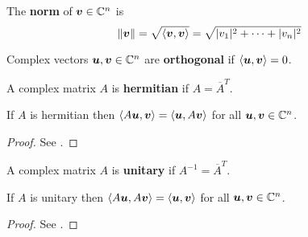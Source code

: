 \begin{definition}
The {\bf norm} \cite[p.463]{KN} of $\boldsymbol{v} \in \mathbb{C}^n$ is
$$
\| \boldsymbol{v} \| = \sqrt{ \langle \boldsymbol{v} , \boldsymbol{v} \rangle } = \sqrt{ |v_1|^2 + \cdots + |v_n|^2 }
$$
\end{definition}

\begin{definition}
Complex vectors $\boldsymbol{u} , \boldsymbol{v} \in \mathbb{C}^n$ are {\bf orthogonal} \cite[p.466]{KN} if $ \langle \boldsymbol{u} , \boldsymbol{v} \rangle = 0$.
\end{definition}

\begin{definition}
A complex matrix $A$ is {\bf hermitian} \cite[p.464]{KN} if $A = \overline{A}^T$.
\end{definition}

\begin{proposition}
If $A$ is hermitian then $\langle A \boldsymbol{u} , \boldsymbol{v} \rangle = \langle \boldsymbol{u} , A \boldsymbol{v} \rangle$ for all $\boldsymbol{u} , \boldsymbol{v} \in \mathbb{C}^n$.

\begin{proof}
See \cite[p.464]{KN}.
\end{proof}
\end{proposition}

\begin{definition}
A complex matrix $A$ is {\bf unitary} \cite[p.466]{KN} if $A^{-1} = \overline{A}^T$.
\end{definition}

\begin{proposition}
If $A$ is unitary then $\langle A \boldsymbol{u} , A \boldsymbol{v} \rangle = \langle \boldsymbol{u} , \boldsymbol{v} \rangle$ for all $\boldsymbol{u} , \boldsymbol{v} \in \mathbb{C}^n$.

\begin{proof}
See \cite[p.466]{KN}.
\end{proof}
\end{proposition}

